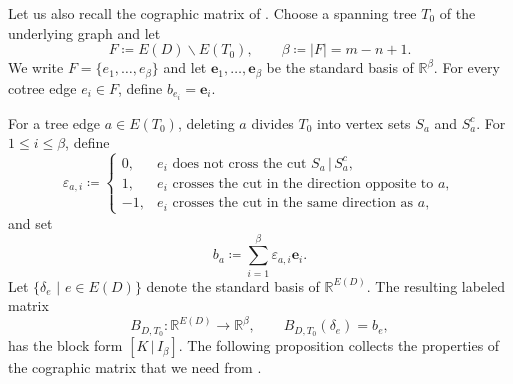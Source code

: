 \documentclass[12pt]{amsart}
\numberwithin{equation}{section}
\numberwithin{theorem}{section}
\newcommand{\R}{\mathbb{R}}
\begin{document}
Let us also recall the cographic matrix of \cite[Definition~4.8]{KMP}.
Choose a spanning tree $T_0$ of the underlying graph and let
\begin{equation*}
  F\coloneqq E(D)\backslash E(T_0),\qquad \beta\coloneqq |F|=m-n+1.
\end{equation*}
We write $F=\{e_1,\dots,e_\beta\}$ and let $\mathbf{e}_1,\dots,\mathbf{e}_\beta$ be the standard basis of $\R^\beta$. For every cotree edge $e_i\in F$, define $b_{e_i}=\mathbf{e}_i$.

For a tree edge $a\in E(T_0)$, deleting $a$ divides $T_0$ into vertex sets $S_a$ and $S_a^c$. For $1\leq i\leq \beta$, define
\begin{equation*}
  \varepsilon_{a,i}\coloneqq
  \begin{cases}
    0, & e_i\text{ does not cross the cut }S_a\,|\, S_a^c,\\
    1, & e_i\text{ crosses the cut in the direction opposite to }a,\\
    -1, & e_i\text{ crosses the cut in the same direction as }a,
  \end{cases}
\end{equation*}
and set
\begin{equation}
  \label{eq-cographic-column}
  b_a\coloneqq \sum_{i=1}^\beta\varepsilon_{a,i}\mathbf e_i.
\end{equation}
Let $\{\delta_e \,\,|\,\, e\in E(D)\}$ denote the standard basis of $\R^{E(D)}$. The resulting labeled matrix
\begin{equation}
  \label{eq-cographic-matrix}
  B_{D,T_0}:\R^{E(D)}\to\R^\beta, \qquad B_{D,T_0}(\delta_e)=b_e,
\end{equation}
has the block form $[K \,|\, I_\beta]$. 
The following proposition collects the properties of the cographic matrix that we need from \cite{KMP}.
\end{document}
